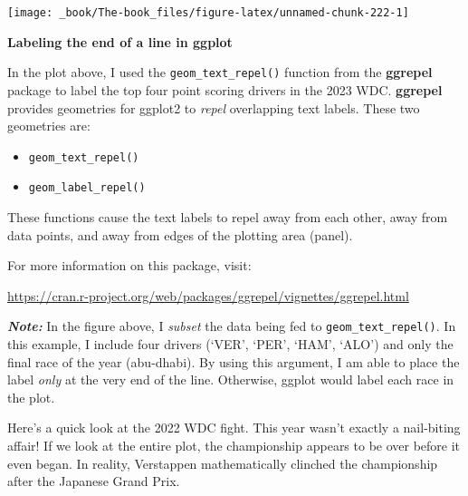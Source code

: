 \documentclass[
]{book}
\providecommand{\tightlist}{%
  \setlength{\itemsep}{0pt}\setlength{\parskip}{0pt}}
\begin{document}
\begin{center}\texttt{[image: \_book/The-book\_files/figure-latex/unnamed-chunk-222-1]} \end{center}

\begin{blackbox}

\begin{center}
\textbf{Labeling the end of a line in ggplot}

\end{center}

In the plot above, I used the \texttt{geom\_text\_repel()} function from the \textbf{ggrepel} package to label the top four point scoring drivers in the 2023 WDC. \textbf{ggrepel} provides geometries for ggplot2 to \emph{repel} overlapping text labels. These two geometries are:

\begin{itemize}
\tightlist
\item
  \texttt{geom\_text\_repel()}
\item
  \texttt{geom\_label\_repel()}
\end{itemize}

These functions cause the text labels to repel away from each other, away from data points, and away from edges of the plotting area (panel).

For more information on this package, visit:

\url{https://cran.r-project.org/web/packages/ggrepel/vignettes/ggrepel.html}

\textbf{\emph{Note:}} In the figure above, I \emph{subset} the data being fed to \texttt{geom\_text\_repel()}. In this example, I include four drivers (`VER', `PER', `HAM', `ALO') and only the final race of the year (abu-dhabi). By using this argument, I am able to place the label \emph{only} at the very end of the line. Otherwise, ggplot would label each race in the plot.

\end{blackbox}

Here's a quick look at the 2022 WDC fight. This year wasn't exactly a nail-biting affair! If we look at the entire plot, the championship appears to be over before it even began. In reality, Verstappen mathematically clinched the championship after the Japanese Grand Prix.
\end{document}
